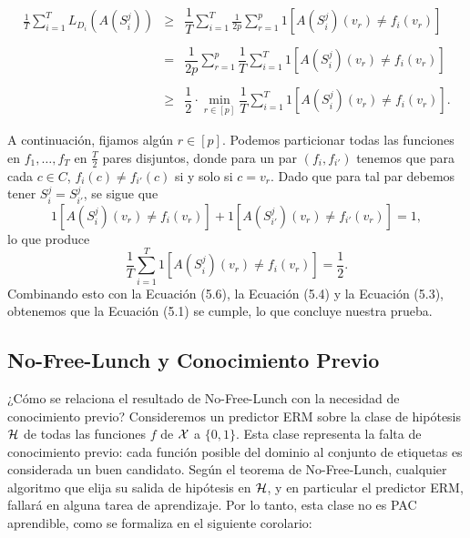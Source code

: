 \begin{teo}
\begin{equation}
    \begin{array}{rcl}
	\frac{1}{T} \sum_{i=1}^{T} L_{D_i}(A(S_i^j)) &\geq & \displaystyle\dfrac{1}{T} \sum_{i=1}^{T} \frac{1}{2p} \sum_{r=1}^{p} 1[A(S_i^j)(v_r) \neq f_i(v_r)]\\\\
						     &=&\displaystyle\dfrac{1}{2p} \sum_{r=1}^{p} \dfrac{1}{T} \sum_{i=1}^{T} 1[A(S_i^j)(v_r) \neq f_i(v_r)]\\\\
						     &\geq & \displaystyle\dfrac{1}{2} \cdot \min_{r \in [p]} \dfrac{1}{T} \sum_{i=1}^{T} 1[A(S_i^j)(v_r) \neq f_i(v_r)].
     \end{array}
\end{equation}

A continuación, fijamos algún $r \in [p]$. Podemos particionar todas las funciones en $f_1, \ldots, f_T$ en $\frac{T}{2}$ pares disjuntos, donde para un par $(f_i, f_{i'})$ tenemos que para cada $c \in C$, $f_i(c) \neq f_{i'}(c)$ si y solo si $c = v_r$. Dado que para tal par debemos tener $S_i^j = S_{i'}^j$, se sigue que
$$
1[A(S_i^j)(v_r) \neq f_i(v_r)] + 1[A(S_{i'}^j)(v_r) \neq f_{i'}(v_r)] = 1,
$$
lo que produce
$$
\frac{1}{T} \sum_{i=1}^{T} 1[A(S_i^j)(v_r) \neq f_i(v_r)] = \frac{1}{2}.
$$
Combinando esto con la Ecuación (5.6), la Ecuación (5.4) y la Ecuación (5.3), obtenemos que la Ecuación (5.1) se cumple, lo que concluye nuestra prueba.
\end{teo}



\subsection{No-Free-Lunch y Conocimiento Previo}
¿Cómo se relaciona el resultado de No-Free-Lunch con la necesidad de conocimiento previo? Consideremos un predictor ERM sobre la clase de hipótesis $\mathop{\mbox{$\mathcal{H}$}}\nolimits$ de todas las funciones $f$ de $\mathop{\mbox{$\mathcal{X}$}}\nolimits$ a $\{0, 1\}$. Esta clase representa la falta de conocimiento previo: cada función posible del dominio al conjunto de etiquetas es considerada un buen candidato. Según el teorema de No-Free-Lunch, cualquier algoritmo que elija su salida de hipótesis en $\mathop{\mbox{$\mathcal{H}$}}\nolimits$, y en particular el predictor ERM, fallará en alguna tarea de aprendizaje.
Por lo tanto, esta clase no es PAC aprendible, como se formaliza en el siguiente corolario:

